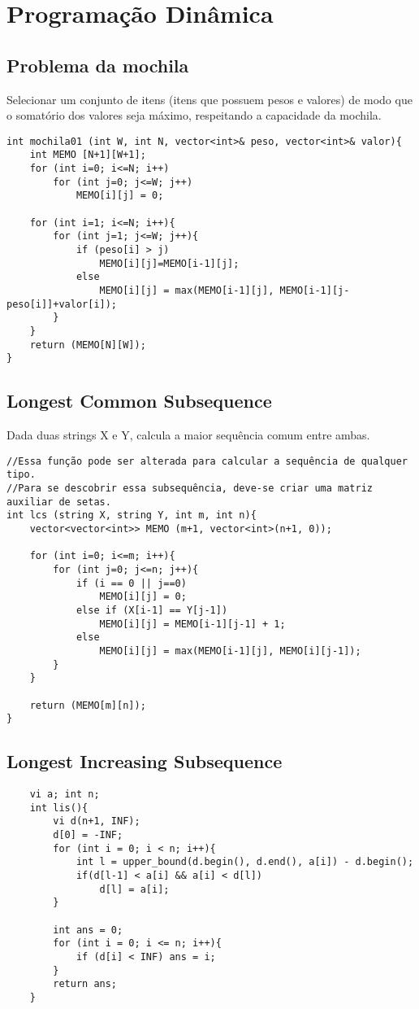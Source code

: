 \section{Programação Dinâmica}
    

\subsection{Problema da mochila}
    Selecionar um conjunto de itens (itens que possuem pesos e valores) de modo que o somatório dos valores seja máximo, respeitando a capacidade da mochila.
\begin{verbatim}
int mochila01 (int W, int N, vector<int>& peso, vector<int>& valor){
    int MEMO [N+1][W+1];
    for (int i=0; i<=N; i++)
        for (int j=0; j<=W; j++)
            MEMO[i][j] = 0;

    for (int i=1; i<=N; i++){
        for (int j=1; j<=W; j++){
            if (peso[i] > j)
                MEMO[i][j]=MEMO[i-1][j];
            else
                MEMO[i][j] = max(MEMO[i-1][j], MEMO[i-1][j-peso[i]]+valor[i]);
        }
    }
    return (MEMO[N][W]);
}
\end{verbatim}

\subsection{Longest Common Subsequence}
Dada duas strings X e Y, calcula a maior sequência comum entre ambas.

\begin{verbatim}
//Essa função pode ser alterada para calcular a sequência de qualquer tipo.
//Para se descobrir essa subsequência, deve-se criar uma matriz auxiliar de setas.
int lcs (string X, string Y, int m, int n){
    vector<vector<int>> MEMO (m+1, vector<int>(n+1, 0));

    for (int i=0; i<=m; i++){
        for (int j=0; j<=n; j++){
            if (i == 0 || j==0)
                MEMO[i][j] = 0;
            else if (X[i-1] == Y[j-1])
                MEMO[i][j] = MEMO[i-1][j-1] + 1;
            else
                MEMO[i][j] = max(MEMO[i-1][j], MEMO[i][j-1]);
        }
    }

    return (MEMO[m][n]);
}
\end{verbatim}

\subsection{Longest Increasing Subsequence}
\begin{verbatim}
    vi a; int n;
    int lis(){
        vi d(n+1, INF);
        d[0] = -INF;
        for (int i = 0; i < n; i++){
            int l = upper_bound(d.begin(), d.end(), a[i]) - d.begin();
            if(d[l-1] < a[i] && a[i] < d[l])
                d[l] = a[i];
        }    

        int ans = 0;
        for (int i = 0; i <= n; i++){
            if (d[i] < INF) ans = i;
        }
        return ans;
    }

\end{verbatim}
\pagebreak

